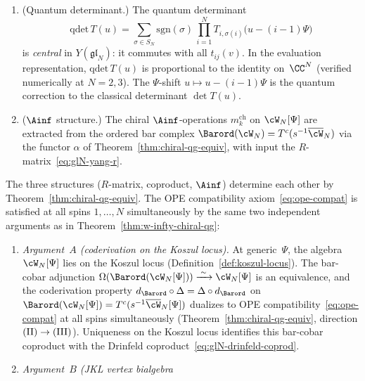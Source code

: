 \begin{theorem}
\begin{enumerate}[label=\textup{(\Roman*)}]
  $t_{ij}^{(r)}$: the commutator $[R_{12}, T_1 T_2]$
  is generically nonzero
  \textup{(}verified numerically at $N = 2, 3$\textup{)}.
\item \textup{(Quantum determinant.)}
  The quantum determinant
  \begin{equation}\label{eq:glN-qdet}
    \mathrm{qdet}\, T(u)
    = \sum_{\sigma \in S_N}
    \mathrm{sgn}(\sigma)\,
    \prod_{i=1}^{N}
    T_{i,\sigma(i)}\bigl(u - (i-1)\Psi\bigr)
  \end{equation}
  is \emph{central} in $Y(\mathfrak{gl}_N)$: it commutes
  with all $t_{ij}(v)$. In the evaluation representation,
  $\mathrm{qdet}\, T(u)$ is proportional to the identity
  on~$\CC^N$ \textup{(}verified numerically at
  $N = 2, 3$\textup{)}.
  The $\Psi$-shift $u \mapsto u - (i-1)\Psi$
  is the quantum correction to the classical determinant
  $\det T(u)$.
\item \textup{($\Ainf$ structure.)}
  The chiral $\Ainf$-operations $m_k^{\mathrm{ch}}$ on
  $\cW_N[\Psi]$ are extracted from the ordered bar complex
  $\Barord(\cW_N) = T^c(s^{-1}\overline{\cW}_N)$ via the
  functor $\alpha$ of
  Theorem~\textup{\ref{thm:chiral-qg-equiv}}, with
  input the $R$-matrix~\eqref{eq:glN-yang-r}.
\end{enumerate}
The three structures \textup{(}$R$-matrix, coproduct,
$\Ainf$\textup{)} determine each other by
Theorem~\textup{\ref{thm:chiral-qg-equiv}}.
The OPE compatibility axiom~\eqref{eq:ope-compat}
is satisfied at all spins $1, \ldots, N$ simultaneously
by the same two independent arguments as in
Theorem~\textup{\ref{thm:w-infty-chiral-qg}}:
\begin{enumerate}[label=\textup{(\alph*)}]
\item \emph{Argument~$A$ \textup{(}coderivation on the
  Koszul locus\textup{)}.}
  At generic~$\Psi$, the algebra $\cW_N[\Psi]$ lies on the
  Koszul locus
  \textup{(}Definition~\textup{\ref{def:koszul-locus}}\textup{)}.
  The bar-cobar adjunction
  $\Omega(\Barord(\cW_N[\Psi]))
  \xrightarrow{\;\sim\;} \cW_N[\Psi]$
  is an equivalence, and the coderivation property
  $d_{\Barord} \circ \Delta = \Delta \circ d_{\Barord}$
  on $\Barord(\cW_N[\Psi]) = T^c(s^{-1}\overline{\cW}_N[\Psi])$
  dualizes to OPE
  compatibility~\eqref{eq:ope-compat} at all spins
  simultaneously
  \textup{(}Theorem~\textup{\ref{thm:chiral-qg-equiv}},
  direction $\textup{(II)} \to \textup{(III)}$\textup{)}.
  Uniqueness on the Koszul locus identifies this bar-cobar
  coproduct with the Drinfeld
  coproduct~\eqref{eq:glN-drinfeld-coprod}.
\item \emph{Argument~$B$ \textup{(}JKL vertex bialgebra
}
\end{enumerate}
\end{theorem}
